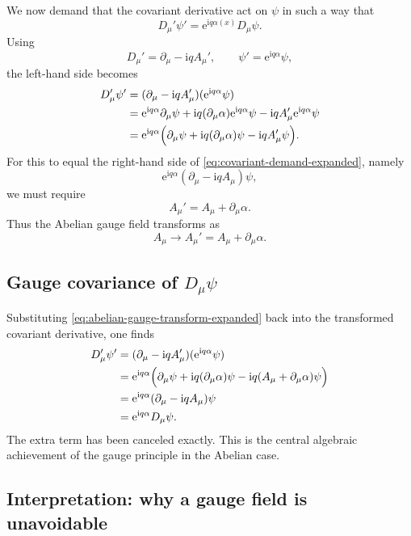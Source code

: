 \documentclass[11pt,a4paper]{article}
\newcommand{\ii}{\mathrm{i}}
\newcommand{\ee}{\mathrm{e}}
\newcommand{\p}{\partial}
\begin{document}
We now demand that the covariant derivative act on \(\psi\) in such a way that
\begin{equation}
D_\mu'\psi' = \ee^{\ii q\alpha(x)}D_\mu\psi.
\label{eq:covariant-demand-expanded}
\end{equation}
Using
\[
D_\mu' = \p_\mu-\ii qA_\mu',
\qquad
\psi'=\ee^{\ii q\alpha}\psi,
\]
the left-hand side becomes
\begin{align}
D_\mu'\psi'
&=(\p_\mu-\ii qA_\mu')(\ee^{\ii q\alpha}\psi)
\nonumber\\
&=\ee^{\ii q\alpha}\p_\mu\psi+\ii q(\p_\mu\alpha)\ee^{\ii q\alpha}\psi-\ii qA_\mu'\ee^{\ii q\alpha}\psi
\nonumber\\
&=\ee^{\ii q\alpha}\Bigl(\p_\mu\psi+\ii q(\p_\mu\alpha)\psi-\ii qA_\mu'\psi\Bigr).
\end{align}
For this to equal the right-hand side of \eqref{eq:covariant-demand-expanded}, namely
\[
\ee^{\ii q\alpha}(\p_\mu-\ii qA_\mu)\psi,
\]
we must require
\[
A_\mu' = A_\mu+\p_\mu\alpha.
\]
Thus the Abelian gauge field transforms as
\begin{equation}
A_\mu\longrightarrow A_\mu' = A_\mu+\p_\mu\alpha.
\label{eq:abelian-gauge-transform-expanded}
\end{equation}



\subsection{Gauge covariance of \texorpdfstring{$D_\mu\psi$}{Dmu psi}}

Substituting \eqref{eq:abelian-gauge-transform-expanded} back into the transformed covariant derivative, one finds
\begin{align}
D_\mu'\psi'
&=(\p_\mu-\ii qA_\mu')(\ee^{\ii q\alpha}\psi)
\nonumber\\
&=\ee^{\ii q\alpha}\Bigl(\p_\mu\psi+\ii q(\p_\mu\alpha)\psi-\ii q(A_\mu+\p_\mu\alpha)\psi\Bigr)
\nonumber\\
&=\ee^{\ii q\alpha}(\p_\mu-\ii qA_\mu)\psi
\nonumber\\
&=\ee^{\ii q\alpha}D_\mu\psi.
\end{align}
The extra term has been canceled exactly. This is the central algebraic achievement of the gauge principle in the Abelian case.

\subsection{Interpretation: why a gauge field is unavoidable}
\end{document}
